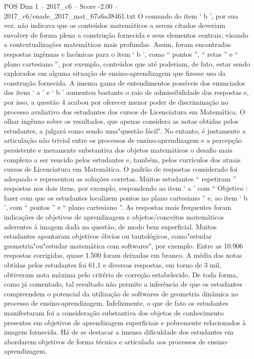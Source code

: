 \begin{textsample}{POS Dim 1 – 2017\_c6 – Score -2.00 – 2017\_c6/enade\_2017\_mat\_67a6a38461.txt}
O comando do item ‘ b ’, por sua vez, não indicava que os conteúdos matemáticos a serem citados deveriam envolver de forma plena a construção fornecida e seus elementos centrais, visando a contextualizações matemáticas mais profundas.
Assim, foram encontradas respostas ingênuas e lacônicas para o item ‘ b ’, como “ pontos ”, “ retas ” e “ plano cartesiano ”, por exemplo, conteúdos que até poderiam, de fato, estar sendo explorados em alguma situação de ensino-aprendizagem que fizesse uso da construção fornecida.
A imensa gama de entendimentos possíveis dos enunciados dos itens ‘ a ’ e ‘ b ’ aumentou bastante o raio de admissibilidade das respostas e, por isso, a questão 4 acabou por oferecer menor poder de discriminação no processo avaliativo dos estudantes dos cursos de Licenciatura em Matemática.
O olhar ingênuo sobre os resultados, que apenas considera as notas obtidas pelos estudantes, a julgará como sendo uma"questão fácil".
No entanto, é justamente a articulação não trivial entre os processos de ensino-aprendizagem e a percepção persistente e meramente substantiva dos objetos matemáticos o desafio mais complexo a ser vencido pelos estudantes e, também, pelos currículos dos atuais cursos de Licenciatura em Matemática.
O padrão de respostas considerado foi adequado e representou as soluções corretas.
Muitos estudantes “ repetiram ” respostas nos dois itens, por exemplo, respondendo ao item ‘ a ’ com “ Objetivo : fazer com que os estudantes localizem pontos no plano cartesiano ” e, ao item ‘ b ’, com “ pontos ” e “ plano cartesiano ”.
As respostas mais frequentes foram indicações de objetivos de aprendizagem e objetos/conceitos matemáticos aderentes à imagem dada na questão, de modo bem superficial.
Muitos estudantes apontaram objetivos óbvios ou tautológicos, como"estudar geometria"ou"estudar matemática com softwares", por exemplo.
Entre as 10.906 respostas corrigidas, quase 1.500 foram deixadas em branco.
A média das notas obtidas pelos estudantes foi 61,1 e diversas respostas, em torno de 3 mil, obtiveram nota máxima pelo critério de correção estabelecido.
De toda forma, como já comentado, tal resultado não permite a inferência de que os estudantes compreendem o potencial da utilização de softwares de geometria dinâmica no processo de ensino-aprendizagem.
Infelizmente, o que de fato os estudantes manifestaram foi a consideração substantiva dos objetos de conhecimento presentes em objetivos de aprendizagem superficiais e pobremente relacionados à imagem fornecida.
Há de se destacar a imensa dificuldade dos estudantes em abordarem objetivos de forma técnica e articulada aos processos de ensino-aprendizagem.

\end{textsample}
